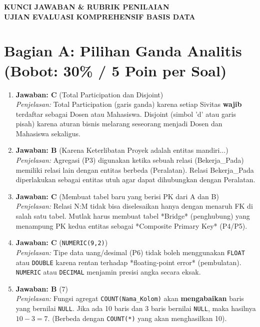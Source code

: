 \documentclass[11pt,a4paper]{article}
\begin{document}
\begin{center}
	\Large\textbf{\sffamily KUNCI JAWABAN \& RUBRIK PENILAIAN} \\
	\large\textbf{\sffamily UJIAN EVALUASI KOMPREHENSIF BASIS DATA}
\end{center}

\vspace{1em}

\section*{Bagian A: Pilihan Ganda Analitis (Bobot: 30\% / 5 Poin per Soal)}

\begin{enumerate}
	\item \textbf{Jawaban: C} (Total Participation dan Disjoint) \\
	      \textit{Penjelasan:} Total Participation (garis ganda) karena setiap Sivitas \textbf{wajib} terdaftar sebagai Dosen atau Mahasiswa. Disjoint (simbol 'd' atau garis pisah) karena aturan bisnis melarang seseorang menjadi Dosen dan Mahasiswa sekaligus.

	\item \textbf{Jawaban: B} (Karena Keterlibatan Proyek adalah entitas mandiri...) \\
	      \textit{Penjelasan:} Agregasi (P3) digunakan ketika sebuah relasi (Bekerja\_Pada) memiliki relasi lain dengan entitas berbeda (Peralatan). Relasi Bekerja\_Pada diperlakukan sebagai entitas utuh agar dapat dihubungkan dengan Peralatan.

	\item \textbf{Jawaban: C} (Membuat tabel baru yang berisi PK dari A dan B) \\
	      \textit{Penjelasan:} Relasi N:M tidak bisa diselesaikan hanya dengan menaruh FK di salah satu tabel. Mutlak harus membuat tabel *Bridge* (penghubung) yang menampung PK kedua entitas sebagai *Composite Primary Key* (P4/P5).

	\item \textbf{Jawaban: C} (\texttt{NUMERIC(9,2)}) \\
	      \textit{Penjelasan:} Tipe data uang/desimal (P6) tidak boleh menggunakan \texttt{FLOAT} atau \texttt{DOUBLE} karena rentan terhadap *floating-point error* (pembulatan). \texttt{NUMERIC} atau \texttt{DECIMAL} menjamin presisi angka secara eksak.

	\item \textbf{Jawaban: B} (7) \\
	      \textit{Penjelasan:} Fungsi agregat \texttt{COUNT(Nama\_Kolom)} akan \textbf{mengabaikan} baris yang bernilai \texttt{NULL}. Jika ada 10 baris dan 3 baris bernilai \texttt{NULL}, maka hasilnya \(10 - 3 = 7\). (Berbeda dengan \texttt{COUNT(*)} yang akan menghasilkan 10).


\end{enumerate}
\end{document}
